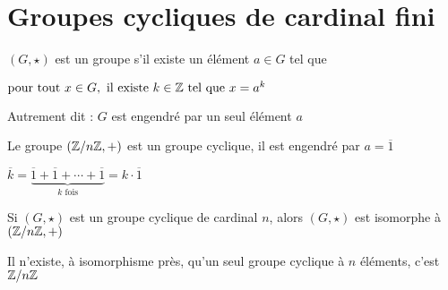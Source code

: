 \section{Groupes cycliques de cardinal fini}

\begin{frame}

\begin{mydefinition}
$(G,\star)$ est un groupe  s'il existe un
élément $a \in G$ tel que 

$\text{pour tout } x \in G, \text{ il existe } k \in \mathbb{Z} \text{ tel que } x = a^k$
\end{mydefinition}


\pause
\bigskip

Autrement dit : $G$ est engendré par un seul élément $a$

\pause
\bigskip

Le groupe $(\mathbb{Z}/n\mathbb{Z},+)$ est un groupe cyclique, il est engendré par $a=\overline 1$

\centerline{$\overline k =  
\underbrace{\overline 1 + \overline 1 + \cdots + \overline 1}_{k \text{ fois}} = k\cdot \overline 1$}


\end{frame}


\begin{frame}

\begin{theoreme}
\label{prop:cyclique}
Si $(G,\star)$ est un groupe cyclique de cardinal $n$, alors  
$(G,\star)$ est isomorphe à $(\mathbb{Z}/n\mathbb{Z},+)$
\end{theoreme}

\pause
\bigskip

Il n'existe, à isomorphisme près, qu'un seul groupe 
cyclique à $n$ éléments, c'est $\mathbb{Z}/n\mathbb{Z}$
\end{frame}


